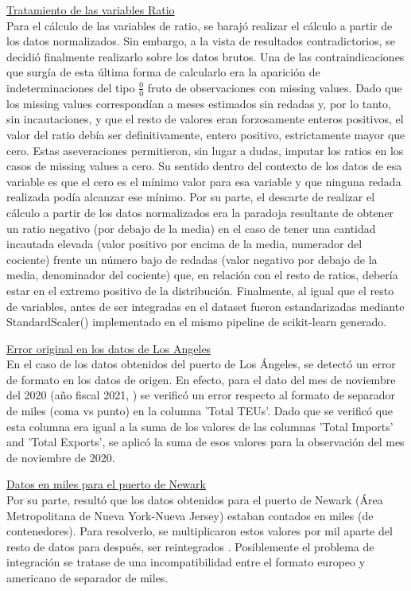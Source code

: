 \documentclass[12pt]{article}
\begin{document}
		\underline{Tratamiento de las variables Ratio}\\
		Para el cálculo de las variables de ratio, se barajó realizar el cálculo a partir de los datos normalizados. Sin embargo, a la vista de resultados contradictorios, se decidió finalmente realizarlo sobre los datos brutos. Una de las contraindicaciones que surgía de esta última forma de calcularlo era la aparición de indeterminaciones del tipo $ \frac{0}{0}$ fruto de observaciones con missing values. Dado que los missing values correspondían a meses estimados sin redadas y, por lo tanto, sin incautaciones, y que el resto de valores eran forzosamente enteros positivos, el valor del ratio debía ser definitivamente, entero positivo, estrictamente mayor que cero. Estas aseveraciones permitieron, sin lugar a dudas, imputar los ratios en los casos de missing values a cero. Su sentido dentro del contexto de los datos de esa variable es que el cero es el mínimo valor para esa variable y que ninguna redada realizada podía alcanzar ese mínimo. Por su parte, el descarte de realizar el cálculo a partir de los datos normalizados era la paradoja resultante de obtener un ratio negativo (por debajo de la media) en el caso de tener una cantidad incautada elevada (valor positivo por encima de la media, numerador del cociente) frente un número bajo de redadas (valor negativo por debajo de la media, denominador del cociente) que, en relación con el resto de ratios, debería estar en el extremo positivo de la distribución. Finalmente, al igual que el resto de variables, antes de ser integradas en el dataset fueron estandarizadas mediante StandardScaler() implementado en el mismo pipeline de scikit-learn generado.
		
		
		\underline{Error original en los datos de Los Angeles}\\
		En el caso de los datos obtenidos del puerto de Los Ángeles, se detectó un error de formato en los datos de origen. En efecto, para el dato del mes de noviembre del 2020 (año fiscal 2021, \cite{portla2025containerstats}) se verificó un error respecto al formato de separador de miles (coma vs punto) en la columna 'Total TEUs'. Dado que se verificó que esta columna era igual a la suma de los valores de las columnas 'Total Imports' and 'Total Exports', se aplicó la suma de esos valores para la observación del mes de noviembre de 2020.
		
		\underline{Datos en miles para el puerto de Newark}\\
		Por su parte, resultó que los datos obtenidos para el puerto de Newark (Área Metropolitana de Nueva York-Nueva Jersey) estaban contados en miles (de contenedores). Para resolverlo, se multiplicaron estos valores por mil aparte del resto de datos para después, ser reintegrados \cite{panynj2025facts}. Posiblemente el problema de integración se tratase de una incompatibilidad entre el formato europeo y americano de separador de miles.
		
\end{document}
